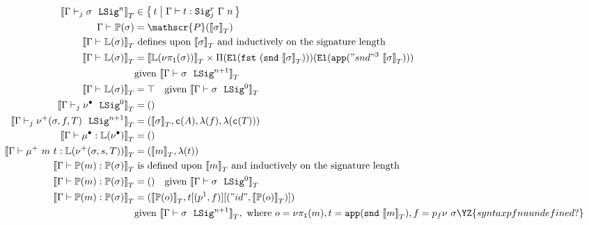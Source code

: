 \begin{align*}
  \denotesT{\goodSigU{j}{\Gamma}{\lsig}{n}} &\in \setc{t}{ \goodTerm{\Gm}{t}{\Sigr{\Gm}{n}{j}} } \\
  {\goodType{\Gamma}{\TyTkg{\lsig}}{}} &= \mathscr{P}(\denotesT{\lsig}) \\
  \denotesT{\goodType{\Gamma}{\TyLkg{\sigma}}{}} &\text{ defines upon } \denotesT{\lsig} 
  \text{ and inductively on the signature length} \\
  \denotesT{\goodType{\Gamma}{\TyLkg{\sigma}}{}} &=
  \denotesT{\TyLkg{\lsigproj{1}{\sigma}}} \times \Pi(\El{\fst{(\snd{\denotesT{\sigma}})}})(\El{\app{"snd"^3~\denotesT{\sigma}}}) \\
  &\text{given } \denotesT{\goodSig{\Gamma}{\sigma}{n+1}} \\
  \denotesT{\goodType{\Gamma}{\TyLkg{\sigma}}{}} &= \top \quad
  \text{given } \denotesT{\goodSig{\Gamma}{\sigma}{0}} \\
  \denotesT{\goodSigU{j}{\Gamma}{\LSigEmp}{0}} &= \unit \\
  \denotesT{\goodSigU{j}{\Gamma}{\LSigAdd{\sigma}{f}{T}}{n+1}} &= (\denotesT{\sigma}, \codety{A}, \lam{f}, \lam{\codety{T}}) \\
  \denotesT{\goodTerm{\Gamma}{\LkgEmp}{\TyLkg{\LSigEmp}}} &= \unit \\
  \denotesT{\goodTerm{\Gamma}{\mu^+~m~t}{\TyLkg{\LSigAdd{\sigma}{s}{T}}}} &= (\denotesT{m}, \lam{t}) \\
  \denotesT{\goodTerm{\Gamma}{\Tkg{m}}{\TyTkg {\sigma}}} & \text{ is defined upon } \denotesT{m} \text{ and inductively on the signature length} \\
  \denotesT{\goodTerm{\Gamma}{\Tkg {m}}{\TyTkg {\sigma}}} &= () \quad \text{given } \denotesT{\goodSig{\Gamma}{\sigma}{0}} \\
  \denotesT{\goodTerm{\Gamma}{\Tkg {m}}{\TyTkg {\sigma}}} &= 
  (\denotesT{\Tkg {o}}, t[(\SubstExt{p^1}{f})][(\SubstExt{"id"}{\denotesT{\Tkg {o}}})]) \\
  & \text{given } \denotesT{\goodSig{\Gamma}{\sigma}{n+1}}, \text{ where } o = \lsigproj{1}{m}, t = \app{\snd{\denotesT{m}}}, f = p_f\nu~\sigma\YZ{syntax pf nu undefined?}
\end{align*}



